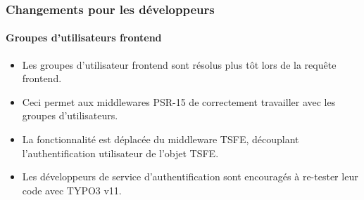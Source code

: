 %

\begin{frame}[fragile]
	\frametitle{Changements pour les développeurs}
	\framesubtitle{Groupes d'utilisateurs frontend}


	\begin{itemize}
		\item Les groupes d'utilisateur frontend sont résolus plus tôt lors de la
			requête frontend.
		\item Ceci permet aux middlewares PSR-15 de correctement travailler avec les groupes d'utilisateurs.
		\item La fonctionnalité est déplacée du middleware TSFE, découplant l'authentification
			utilisateur de l'objet TSFE.
		\item Les développeurs de service d'authentification sont encouragés à re-tester leur code avec
			TYPO3 v11.
	\end{itemize}

\end{frame}

